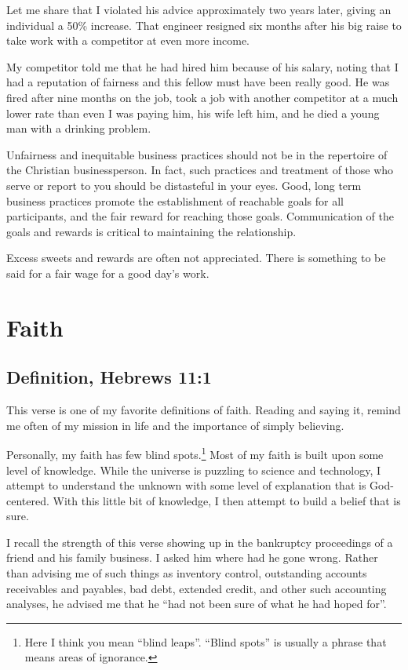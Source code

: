 \documentclass[12pt]{memoir}
\begin{document}
Let me share that I violated his advice approximately two years
later, giving an individual a 50\% increase. That engineer resigned
six months after his big raise to take work with a competitor at
even more income.

My competitor told me that he had hired him because
of his salary, noting that I had a reputation of fairness and this
fellow must have been really good. He was fired after nine months
on the job, took a job with another competitor at a much lower rate
than even I was paying him, his wife left him, and he died a young
man with a drinking problem.

Unfairness and inequitable business practices should not be in the repertoire of the Christian businessperson. In fact, such practices and treatment of those who serve or report to you should be distasteful in your eyes. Good, long term business practices promote the establishment of reachable goals for all participants, and the fair reward for reaching those goals. Communication of the goals and rewards is critical to maintaining the relationship.

Excess sweets and rewards are often not appreciated. There is something
to be said for a fair wage for a good day's work.

\section{Faith}

\subsection[Definition]{Definition, Hebrews 11:1}

This verse is one of my favorite definitions of faith. Reading
and saying it, remind me often of my mission in life and the importance
of simply believing.

Personally, my faith has few blind spots.\footnote{Here I think you mean ``blind leaps''. ``Blind spots'' is usually a phrase that means areas of ignorance.}
Most of my faith is built upon some level of knowledge. While the
universe is puzzling to science and technology, I attempt to understand
the unknown with some level of explanation that is God-centered. With
this little bit of knowledge, I then attempt to build a belief that
is sure.

I recall the strength of this verse showing up in the bankruptcy proceedings
of a friend and his family business. I asked him where had he gone
wrong. Rather than advising me of such things as inventory control,
outstanding accounts receivables and payables, bad debt, extended
credit, and other such accounting analyses, he advised me that
he ``had not been sure of what he had hoped for''.
\end{document}
